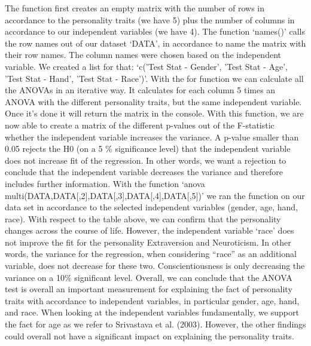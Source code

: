 \newline \newline
The function first creates an empty matrix with the number of rows in accordance to the personality traits (we have 5) plus the number of columns in accordance to our independent variables (we have 4). The function `names()' calls the row names out of our dataset `DATA', in accordance to name the matrix with their row names. The column names were chosen based on the independent variable. We created a list for that: `c('Test Stat - Gender', 'Test Stat - Age', 'Test Stat - Hand', 'Test Stat - Race')'.
\newline \newline
With the for function we can calculate all the ANOVAs in an iterative way. It calculates for each column 5 times an ANOVA with the different personality traits, but the same independent variable. Once it’s done it will return the matrix in the console. 
\newline \newline
With this function, we are now able to create a matrix of the different p-values out of the F-statistic whether the independent variable increases the variance. A p-value smaller than 0.05 rejects the H0 (on a 5 \% significance level) that the independent variable does not increase fit of the regression. In other words, we want a rejection to conclude that the independent variable decreases the variance and therefore includes further information.
\newline \newline
With the function `anova\underline{ }multi(DATA,DATA{[,2]},DATA{[,3]},DATA{[,4]},DATA{[,5]})' we ran the function on our data set in accordance to the selected independent variables (gender, age, hand, race). 
\newline \newline
With respect to the table above, we can confirm that the personality changes across the course of life.
However, the independent variable `race' does not improve the fit for the personality Extraversion and Neuroticism. In other words, the variance for the regression, when considering “race” as an additional variable, does not decrease for these two. Conscientiousness is only decreasing the variance on a 10\% significant level. Overall, we can conclude that the ANOVA test is overall an important measurement for explaining the fact of personality traits with accordance to independent variables, in particular gender, age, hand, and race. When looking at the independent variables fundamentally, we support the fact for age as we refer to Srivastava et al. (2003). However, the other findings could overall not have a significant impact on explaining the personality traits. 


